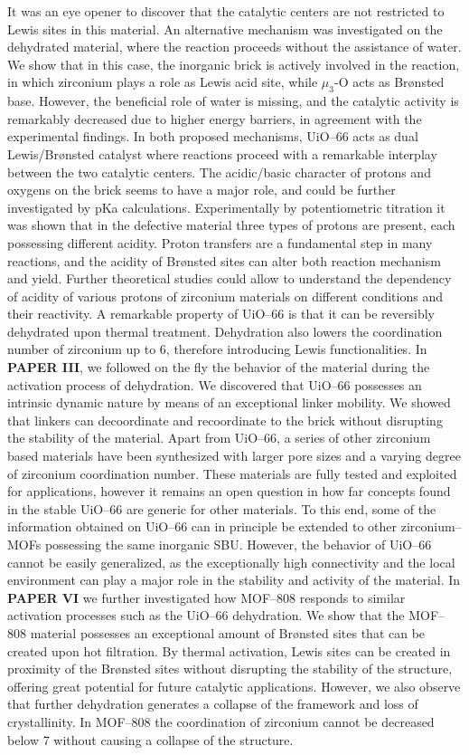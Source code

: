 It was an eye opener to discover that the catalytic centers are not restricted to Lewis sites in this material. 
An alternative mechanism was investigated on the dehydrated material, where the reaction proceeds without the assistance of water. We show that in this case, the inorganic brick is actively involved in the reaction, in which zirconium plays a role as Lewis acid site, while $\mu_{3}$-O acts as Br\o{}nsted base. However, the beneficial role of water is missing, and the catalytic activity is remarkably decreased due to higher energy barriers, in agreement with the experimental findings. 
In both proposed mechanisms, UiO--66 acts as dual Lewis/Br\o{}nsted catalyst where reactions proceed with a remarkable interplay between the two catalytic centers. The acidic/basic character of protons and oxygens on the brick seems to have a major role, and could be further investigated by pKa calculations. Experimentally by potentiometric titration it was shown that in the defective material three types of protons are present, each possessing different acidity. Proton transfers are a fundamental step in many reactions, and the acidity of Br\o{}nsted sites can alter both reaction mechanism and yield. Further theoretical studies could allow to understand the dependency of acidity of various protons of zirconium materials on different conditions and their reactivity.
\npar
A remarkable property of UiO--66 is that it can be reversibly dehydrated upon thermal treatment. Dehydration also lowers the coordination number of zirconium up to 6, therefore introducing Lewis functionalities. In \textbf{PAPER III}, we followed on the fly the behavior of the material during the activation process of dehydration. We discovered that UiO--66 possesses an intrinsic dynamic nature by means of an exceptional linker mobility. We showed that linkers can decoordinate and recoordinate to the brick without disrupting the stability of the material.
\npar
Apart from UiO--66, a series of other zirconium based materials have been synthesized with larger pore sizes and a varying degree of zirconium coordination number. These materials are fully tested and exploited for applications, however it remains an open question in how far concepts found in the stable UiO--66 are generic for other materials. To this end, some of the information obtained on UiO--66 can in principle be extended to other zirconium--MOFs possessing the same inorganic SBU. However, the behavior of UiO--66 cannot be easily generalized, as the exceptionally high connectivity and the local environment can play a major role in the stability and activity of the material. In \textbf{PAPER VI} we further investigated how MOF--808 responds to similar activation processes such as the UiO--66 dehydration. We show that the MOF--808 material possesses an exceptional amount of Br\o{}nsted sites that can be created upon hot filtration. By thermal activation, Lewis sites can be created in proximity of the Br\o{}nsted sites without disrupting the stability of the structure, offering great potential for future catalytic applications. However, we also observe that further dehydration generates a collapse of the framework and loss of crystallinity. In MOF--808 the coordination of zirconium cannot be decreased below 7 without causing a collapse of the structure.
